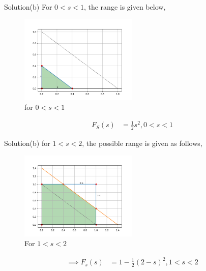 \documentclass{beamer}
\theoremstyle{remark}
\numberwithin{equation}{subsection}
\begin{document}
\begin{frame}{Solution(b)}
    For $0 < s < 1$, the range is given below,
    \begin{figure}
        \centering
        \includegraphics[width=0.5\textwidth]{plot2.png}
        \caption{for $0<s<1$}
        \label{fig:my_label}
    \end{figure}
    \begin{align}
        F_S(s) &= \frac{1}{2} s^2, 0<s<1
    \end{align}
\end{frame}

\begin{frame}{Solution(b)}
    for $1<s<2$, the possible range is given as follows,
    \begin{figure}
        \centering
        \includegraphics[width=0.5\textwidth]{plot3.png}
        \caption{For $1<s<2$}
        \label{fig:my_label}
    \end{figure}
    \begin{align}
        \implies F_s(s) &= 1 - \frac{1}{2}(2-s)^2, 1<s<2
    \end{align}
\end{frame}
\end{document}
